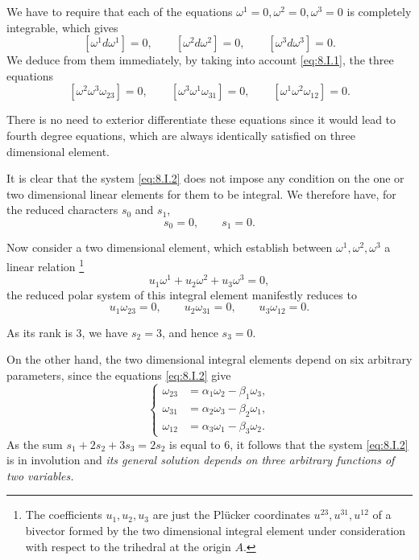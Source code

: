 \documentclass[leqno,11pt]{book}
\numberwithin{equation}{chapter}
\theoremstyle{shape1}
\theoremstyle{shape0}
\theoremstyle{shape2}
\theoremstyle{definition}
\begin{document}
We have to require that each of the equations $\omega^{1}=0,\omega^{2}=0,\omega^{3}=0$ is completely integrable, which gives
\[
[\omega^{1}d\omega^{1}]=0,\qquad[\omega^{2}d\omega^{2}]=0,\qquad[\omega^{3}d\omega^{3}]=0.
\]
We deduce from them immediately, by taking into account \eqref{eq:8.I.1}, the three equations
\begin{equation}
  \label{eq:8.I.2}\tag{I, 2}
  [\omega^{2}\omega^{3}\omega_{23}]=0,\qquad[\omega^{3}\omega^{1}\omega_{31}]=0,\qquad[\omega^{1}\omega^{2}\omega_{12}]=0.
\end{equation}

There is no need to exterior differentiate these equations since it would lead to fourth degree equations, which are always identically satisfied on three dimensional element.

It is clear that the system \eqref{eq:8.I.2} does not impose any condition on the one or two dimensional linear elements for them to be integral. We therefore have, for the reduced characters $s_{0}$ and $s_{1}$,
\[
s_{0}=0,\qquad s_{1}=0.
\]

Now consider a two dimensional element, which establish between $\omega^{1},\omega^{2},\omega^{3}$ a linear relation \footnote{The coefficients $u_{1},u_{2},u_{3}$ are just the Pl\"ucker coordinates $u^{23},u^{31},u^{12}$ of a bivector formed by the two dimensional integral element under consideration with respect to the trihedral at the origin $A$.}
\[
u_{1}\omega^{1}+u_{2}\omega^{2}+u_{3}\omega^{3}=0,
\]
the reduced polar system of this integral element manifestly reduces to
\begin{equation}
  \label{eq:8.I.3}\tag{I, 3}
  u_{1}\omega_{23}=0,\qquad u_{2}\omega_{31}=0,\qquad u_{3}\omega_{12}=0.
\end{equation}

As its rank is $3$, we have $s_{2}=3$, and hence $s_{3}=0$.

On the other hand, the two dimensional integral elements depend on six arbitrary parameters, since the equations \eqref{eq:8.I.2} give
\begin{equation}
  \label{eq:8.I.4}\tag{I, 4}
  \left\{
    \begin{aligned}
      \omega_{23}&=\alpha_{1}\omega_{2}-\beta_{1}\omega_{3},\\
      \omega_{31}&=\alpha_{2}\omega_{3}-\beta_{2}\omega_{1},\\
      \omega_{12}&=\alpha_{3}\omega_{1}-\beta_{3}\omega_{2}.
    \end{aligned}
  \right.
\end{equation}
As the sum $s_{1}+2s_{2}+3s_{3}=2s_{2}$ is equal to $6$, it follows that the system \eqref{eq:8.I.2} is in involution and \emph{its general solution depends on three arbitrary functions of two variables.}
\end{document}
